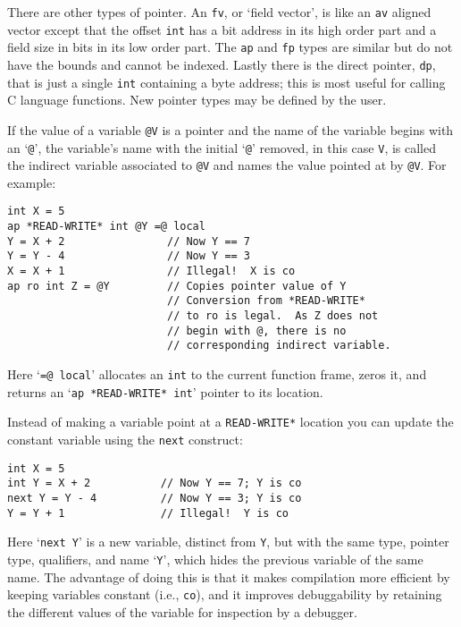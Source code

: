 \documentclass[12pt]{article}
\newenvironment{indpar}[1][0.3in]%
	{\begin{list}{}%
		     {\setlength{\itemsep}{0in}%
		      \setlength{\topsep}{0in}%
		      \setlength{\parsep}{1ex}%
		      \setlength{\labelwidth}{#1}%
		      \setlength{\leftmargin}{#1}%
		      \addtolength{\leftmargin}{\labelsep}}%
	 \item}%
	{\end{list}}
\begin{document}
There are other types of pointer.  An {\tt fv}, or `field vector',
is like an {\tt av} aligned
vector except that the offset {\tt int} has a bit address in its
high order part and a field size in bits in its low order part.
The {\tt ap} and {\tt fp} types are
similar but do not have the bounds and cannot be indexed.  Lastly
there is the direct pointer, {\tt dp}, that is just a single {\tt int}
containing a byte address; this is most useful for calling
C language functions.
New pointer types may be defined by the user.

If the value of a variable {\tt @V} is a pointer and the name of
the variable begins with an `{\tt @}', the variable's name with the
initial `{\tt @}' removed, in this case {\tt V}, is called the
indirect variable associated to {\tt @V}
and names the value pointed at by {\tt @V}.
For example:

\begin{indpar}\begin{verbatim}
int X = 5
ap *READ-WRITE* int @Y =@ local
Y = X + 2                // Now Y == 7
Y = Y - 4                // Now Y == 3
X = X + 1                // Illegal!  X is co
ap ro int Z = @Y         // Copies pointer value of Y
                         // Conversion from *READ-WRITE*
                         // to ro is legal.  As Z does not
                         // begin with @, there is no
                         // corresponding indirect variable.
\end{verbatim}\end{indpar}

Here `{\tt =@ local}' allocates an {\tt int} to the current
function frame, zeros it, and returns an `{\tt ap *READ-WRITE* int}'
pointer to its location.

Instead of making a variable point at a {\tt *READ-WRITE*} location you
can update the constant variable using the {\tt next} construct:
\begin{indpar}\begin{verbatim}
int X = 5
int Y = X + 2           // Now Y == 7; Y is co
next Y = Y - 4          // Now Y == 3; Y is co
Y = Y + 1               // Illegal!  Y is co
\end{verbatim}\end{indpar}
Here `{\tt next Y}' is a new variable, distinct from {\tt Y},
but with the same type, pointer type, qualifiers, and name `{\tt Y}',
which hides the previous variable of the same name.
The advantage of doing this is that it makes compilation more
efficient by keeping variables constant (i.e., {\tt co}), and
it improves debuggability by retaining the different values of
the variable for inspection by a debugger.
\end{document}
